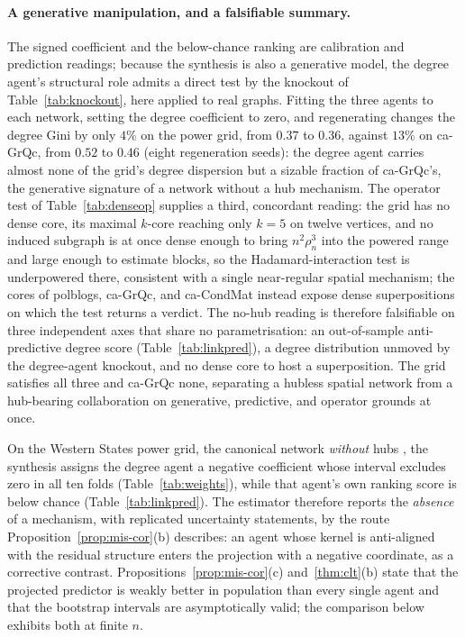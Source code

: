 \documentclass[12pt]{article}
\newcommand{\1}{\mathbf{1}}
\begin{document}
\paragraph{A generative manipulation, and a falsifiable summary.} The signed coefficient and the below-chance ranking are calibration and prediction readings; because the synthesis is also a generative model, the degree agent's structural role admits a direct test by the knockout of Table~\ref{tab:knockout}, here applied to real graphs. Fitting the three agents to each network, setting the degree coefficient to zero, and regenerating changes the degree Gini by only $4\%$ on the power grid, from $0.37$ to $0.36$, against $13\%$ on \textsf{ca-GrQc}, from $0.52$ to $0.46$ (eight regeneration seeds): the degree agent carries almost none of the grid's degree dispersion but a sizable fraction of \textsf{ca-GrQc}'s, the generative signature of a network without a hub mechanism. The operator test of Table~\ref{tab:denseop} supplies a third, concordant reading: the grid has no dense core, its maximal $k$-core reaching only $k=5$ on twelve vertices, and no induced subgraph is at once dense enough to bring $n^2\rho_n^3$ into the powered range and large enough to estimate blocks, so the Hadamard-interaction test is underpowered there, consistent with a single near-regular spatial mechanism; the cores of \textsf{polblogs}, \textsf{ca-GrQc}, and \textsf{ca-CondMat} instead expose dense superpositions on which the test returns a verdict. The no-hub reading is therefore falsifiable on three independent axes that share no parametrisation: an out-of-sample anti-predictive degree score (Table~\ref{tab:linkpred}), a degree distribution unmoved by the degree-agent knockout, and no dense core to host a superposition. The grid satisfies all three and \textsf{ca-GrQc} none, separating a hubless spatial network from a hub-bearing collaboration on generative, predictive, and operator grounds at once.

\label{sec:linkpred}
On the Western States power grid, the canonical network \emph{without} hubs
\citep{watts1998collective}, the synthesis assigns the degree agent a negative
coefficient whose interval excludes zero in all ten folds (Table~\ref{tab:weights}), while that
agent's own ranking score is below chance (Table~\ref{tab:linkpred}). The estimator therefore
reports the \emph{absence} of a mechanism, with replicated uncertainty statements, by the route
Proposition~\ref{prop:mis-cor}(b) describes: an agent whose kernel is anti-aligned with the residual
structure enters the projection with a negative coordinate, as a corrective contrast.
Propositions~\ref{prop:mis-cor}(c) and~\ref{thm:clt}(b) state that the projected predictor is weakly
better in population than every single agent and that the bootstrap intervals are asymptotically valid;
the comparison below exhibits both at finite $n$.
\end{document}
